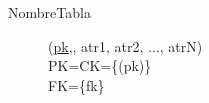 \begin{description}
 \item[NombreTabla](\underline{pk},, atr1, atr2, ..., atrN)\\
PK=CK=\{(pk)\}\\
FK=\{fk\}\\

\end{description}

\newpage
